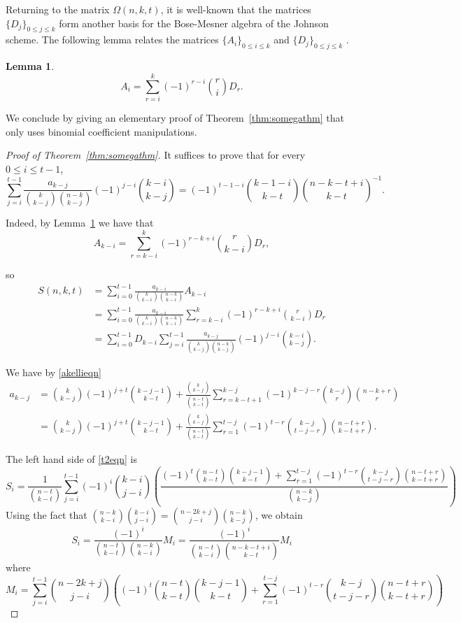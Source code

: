 \documentclass[12pt]{article}
\newtheorem{lemma}{Lemma}
\theoremstyle{definition}
\theoremstyle{remark}
\begin{document}
Returning to the matrix $\Omega(n, k, t)$, it is well-known that the matrices $\{D_j\}_{0\le j\le k}$ form another basis for the Bose-Mesner algebra of the Johnson scheme. The following lemma relates the matrices $\{A_i\}_{0\le i\le k}$ and $\{D_j\}_{0\le j\le k}$ \cite[pg.121]{GM}.

\begin{lemma}\label{lem:aidj}
\[A_i = \sum_{r=i}^{k}(-1)^{r-i}\binom{r}{i}D_r.\]
\end{lemma}

We conclude by giving an elementary proof of Theorem~\ref{thm:somegathm} that only uses binomial coefficient manipulations. 

\begin{proof}[Proof of Theorem~\ref{thm:somegathm}]

It suffices to prove that for every $0\le i\le t-1$, 
\begin{equation}\label{t2eqn}
\sum_{j=i}^{t-1} \frac{a_{k-j}}{\binom{k}{k-j}\binom{n-k}{k-j}} (-1)^{j-i} \binom{k-i}{k-j} = (-1)^{t-1-i} \binom{k-1-i}{k-t}\binom{n-k-t+i}{k-t}^{-1}.
\end{equation}

Indeed, by Lemma~\ref{lem:aidj} we have that 
\[A_{k-i} = \sum_{r=k-i}^k(-1)^{r-k+i}\binom{r}{k-i} D_r,\]

so 
\begin{align*}
S(n, k, t) &= \sum_{i=0}^{t-1}\frac{a_{k-i}}{\binom{k}{k-i}\binom{n-k}{k-i}}A_{k-i}\\
& = \sum_{i=0}^{t-1}\frac{a_{k-i}}{\binom{k}{k-i}\binom{n-k}{k-i}}\sum_{r=k-i}^k(-1)^{r-k+i}\binom{r}{k-i} D_r\\
&= \sum_{i=0}^{t-1} D_{k-i} \sum_{j=i}^{t-1} \frac{a_{k-j}}{\binom{k}{k-j}\binom{n-k}{k-j}} (-1)^{j-i} \binom{k-i}{k-j}.
\end{align*}


We have by \eqref{akellieqn}
\begin{align*}
a_{k-j} &= \binom{k}{k-j}(-1)^{j+t}\binom{k-j-1}{k-t} + \frac{\binom{k}{k-j}}{\binom{n-t}{k-t}} \sum_{r=k-t+1}^{k-j}(-1)^{k-j-r}\binom{k-j}{r}\binom{n-k+r}{r}\\
&=  \binom{k}{k-j}(-1)^{j+t}\binom{k-j-1}{k-t} + \frac{\binom{k}{k-j}}{\binom{n-t}{k-t}}\sum_{r=1}^{t-j}(-1)^{t-r}\binom{k-j}{t-j-r}\binom{n-t+r}{k-t+r}.
\end{align*}

The left hand side of \eqref{t2eqn} is  
\[
S_i =\frac{1}{\binom{n-t}{k-t}} \sum_{j=i}^{t-1}(-1)^i\binom{k-i}{j-i}\left(\frac{(-1)^{t}\binom{n-t}{k-t}\binom{k-j-1}{k-t} + \sum_{r=1}^{t-j}(-1)^{t-r}\binom{k-j}{t-j-r}\binom{n-t+r}{k-t+r}}{\binom{n-k}{k-j}}\right)\]
Using the fact that $\binom{n-k}{k-i}\binom{k-i}{j-i}   = \binom{n-2k+j}{j-i}\binom{n-k}{k-j}$, we obtain
\begin{equation}\label{si}
S_i = \frac{(-1)^i}{\binom{n-t}{k-t}\binom{n-k}{k-i}}M_i
= \frac{(-1)^i}{\binom{n-t}{k-i}\binom{n-k-t+i}{k-t}}M_i
\end{equation}
where
\begin{equation}\label{mi}
M_i = \sum_{j=i}^{t-1}\binom{n-2k+j}{j-i}\left((-1)^{t}\binom{n-t}{k-t}\binom{k-j-1}{k-t} + \sum_{r=1}^{t-j}(-1)^{t-r}\binom{k-j}{t-j-r}\binom{n-t+r}{k-t+r}\right)
\end{equation}


\end{proof}
\end{document}
